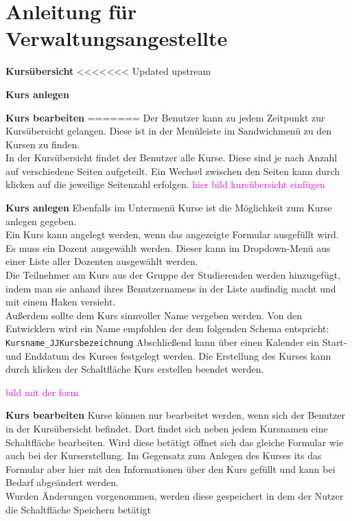
\chapter{Anleitung für Verwaltungsangestellte}
\label{sec:chap1}
\textbf{Kursübersicht}
<<<<<<< Updated upstream

\textbf{Kurs anlegen}

\textbf{Kurs bearbeiten}
=======
Der Benutzer kann zu jedem Zeitpunkt zur Kursübersicht gelangen. Diese ist in der Menüleiste im Sandwichmenü zu den Kursen zu finden.\\
In der Kursübersicht findet der Benutzer alle Kurse. Diese sind je nach Anzahl auf verschiedene Seiten aufgeteilt. Ein Wechsel zwischen den Seiten kann durch klicken auf die jeweilige Seitenzahl erfolgen. 
\textcolor{magenta}{hier bild kursübersicht einfügen}

\textbf{Kurs anlegen}
Ebenfalls im Untermenü Kurse ist die Möglichkeit zum Kurse anlegen gegeben.\\
Ein Kurs kann angelegt werden, wenn das angezeigte Formular ausgefüllt wird. Es muss ein Dozent ausgewählt werden. Dieser kann im Dropdown-Menü aus einer Liste aller Dozenten ausgewählt werden. \\
Die Teilnehmer am Kurs aus der Gruppe der Studierenden werden hinzugefügt, indem man sie anhand ihres Benutzernamens in der Liste ausfindig macht und mit einem Haken versieht. \\
Außerdem sollte dem Kurs sinnvoller Name vergeben werden. Von den Entwicklern wird ein Name empfohlen der dem folgenden Schema entspricht: \\
\verb/Kursname_JJKursbezeichnung/
Abschließend kann über einen Kalender ein Start- und Enddatum des Kurses festgelegt werden. 
Die Erstellung des Kurses kann durch klicken der Schaltfläche \glqq Kurs erstellen\grqq\: beendet werden.

\textcolor{magenta}{bild mit der form}

\textbf{Kurs bearbeiten}
Kurse können nur bearbeitet werden, wenn sich der Benutzer in der Kursübersicht befindet. Dort findet sich neben jedem Kursnamen eine Schaltfläche \glqq bearbeiten\grqq . Wird diese betätigt öffnet sich das gleiche Formular wie auch bei der Kurserstellung. Im Gegensatz zum Anlegen des Kurses its das Formular aber hier mit den Informationen über den Kurs gefüllt und kann bei Bedarf abgeändert werden.\\
Wurden Änderungen vorgenommen, werden diese gespeichert in dem der Nutzer die Schaltfläche \glqq Speichern\grqq\: betätigt

